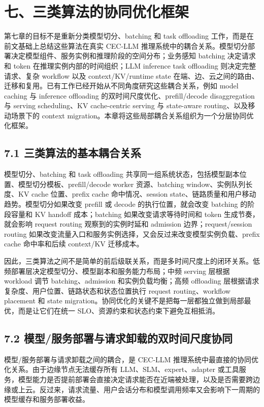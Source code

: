 \documentclass[a4paper,twocolumn,10pt]{ctexart}
\begin{document}
\section{七、三类算法的协同优化框架}

第七章的目标不是重新分类模型切分、batching 和 task offloading 工作，而是在前文基础上总结这些算法在真实 CEC-LLM 推理系统中的耦合关系。模型切分部署决定模型组件、服务实例和推理阶段的空间分布；业务感知 batching 决定请求和 token 在推理实例内部的时间组织；LLM inference task offloading 则决定完整请求、复杂 workflow 以及 context/KV/runtime state 在端、边、云之间的路由、迁移和复用。已有工作已经开始从不同角度研究这些耦合关系，例如 model caching 与 inference offloading 的双时间尺度优化、prefill/decode disaggregation 与 serving scheduling、KV cache-centric serving 与 state-aware routing、以及移动场景下的 context migration。本章将这些局部耦合关系组织为一个分层协同优化框架。


\subsection{7.1 三类算法的基本耦合关系}

模型切分、batching 和 task offloading 共享同一组系统状态，包括模型副本位置、模型切分模板、prefill/decode worker 资源、batching window、实例队列长度、KV cache 位置、prefix cache 命中情况、session state、链路质量和用户移动趋势。模型切分如果改变 prefill 或 decode 的执行位置，就会改变 batching 的阶段容量和 KV handoff 成本；batching 如果改变请求等待时间和 token 生成节奏，就会影响 request routing 观察到的实例时延和 admission 边界；request/session routing 如果改变流量入口和服务实例选择，又会反过来改变模型实例负载、prefix cache 命中率和后续 context/KV 迁移成本。


因此，三类算法之间不是简单的前后级联关系，而是多时间尺度上的闭环关系。低频部署层决定模型切分、模型副本和服务能力布局；中频 serving 层根据 workload 调节 batching、admission 和实例负载均衡；高频 offloading 层根据请求复杂度、用户位置、链路状态和状态位置执行 request routing、workflow placement 和 state migration。协同优化的关键不是把每一层都独立做到局部最优，而是让它们在统一 SLO、资源约束和状态约束下避免互相抵消。


\subsection{7.2 模型/服务部署与请求卸载的双时间尺度协同}

模型/服务部署与请求卸载之间的耦合，是 CEC-LLM 推理系统中最直接的协同优化关系。由于边缘节点无法缓存所有 LLM、SLM、expert、adapter 或工具服务，模型能力是否提前部署会直接决定请求能否在近端被处理，以及是否需要跨边缘或上云。反过来，请求流量、用户会话分布和模型调用频率又会影响下一周期的模型缓存和服务部署收益。
\end{document}
